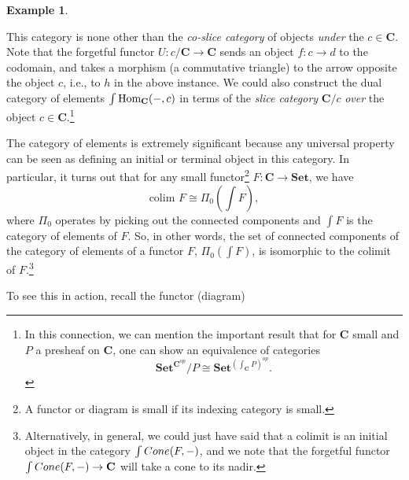 \documentclass[a4paper]{book}
\theoremstyle{definition}
\newtheorem{example}{Example}[section]
\theoremstyle{definition}
\theoremstyle{definition}
\theoremstyle{theorem}
\theoremstyle{definition}
\begin{document}
\begin{example}
	\begin{center}  
	\end{center} 
	This category is none other than the \textit{co-slice category} of objects \textit{under} the $c \in \textbf{C}$. Note that the forgetful functor $U: c/\textbf{C} \rightarrow \textbf{C}$ sends an object $f: c \rightarrow d$ to the codomain, and takes a morphism (a commutative triangle) to the arrow opposite the object $c$, i.e., to $h$ in the above instance. We could also construct the dual category of elements $\int \text{Hom}_{\textbf{C}}(\--, c)$ in terms of the \textit{slice category} $\textbf{C}/c$ \textit{over} the object $c \in \textbf{C}$.\footnote{In this connection, we can mention the important result that for $\textbf{C}$ small and $P$ a presheaf on \textbf{C}, one can show an equivalence of categories 
		\begin{equation*}
		\textbf{Set}^{\textbf{C}^{op}}/P \cong \textbf{Set}^{(\int_{\textbf{C}} P)^{op}} . 
		\end{equation*} } \par 
	The category of elements is extremely significant because any universal property can be seen as defining an initial or terminal object in this category. In particular, it turns out that for any small functor\footnote{A functor or diagram is small if its indexing category is small. } $F: \textbf{C} \rightarrow \textbf{Set}$, we have 
	\begin{equation}
	\text{colim } F \cong \Pi_0 (\int F),
	\end{equation}
	where $\Pi_0$ operates by picking out the connected components and $\int F$ is the category of elements of $F$. So, in other words, the set of connected components of the category of elements of a functor $F$, $\Pi_0 (\int F)$, is isomorphic to the colimit of $F$.\footnote{Alternatively, in general, we could just have said that a colimit is an initial object in the category $\int Cone(F, \--)$, and we note that the forgetful functor $\int Cone(F, \--) \rightarrow \textbf{C}$ will take a cone to its nadir.} \par 
	To see this in action, recall the functor (diagram) 
	\begin{center} 

\end{center}
\end{example}
\end{document}
